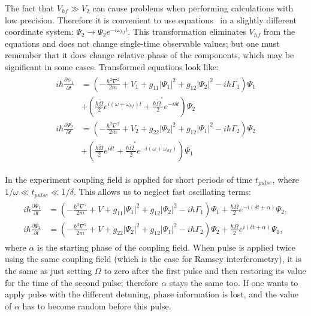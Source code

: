 The fact that $V_{hf} \gg V_2$ can cause problems when performing calculations with low precision.
Therefore it is convenient to use equations~
in a slightly different coordinate system:
$\Psi_2 \rightarrow \Psi_2 e^{-i \omega_{hf} t}$.
This transformation eliminates $V_{hf}$ from the equations and does not change single-time observable values;
but one must remember that it does change relative phase of the components,
which may be significant in some cases.
Transformed equations look like:
\begin{align*}
\begin{split}
	i \hbar \frac{\partial \psi_1}{\partial t} & = \left(
		-\frac{\hbar^2 \nabla^2}{2 m} + V_1
		+ g_{11} \lvert \Psi_1 \rvert^2
		+ g_{12} \lvert \Psi_2 \rvert^2
		- i \hbar \Gamma_1
	\right) \Psi_1 \\
	& + \left(
		\frac{\hbar \tilde{\Omega}}{2} e^{i (\omega + \omega_{hf}) t}
		+ \frac{\hbar \tilde{\Omega}^*}{2} e^{-i \delta t}
	\right) \Psi_2 \\
	i \hbar \frac{\partial \Psi_2}{\partial t} & = \left(
		-\frac{\hbar^2 \nabla^2}{2 m} + V_2
		+ g_{22} \lvert \Psi_2 \rvert^2
		+ g_{12} \lvert \Psi_1 \rvert^2
		- i \hbar \Gamma_2
	\right) \Psi_2 \\
	& + \left(
		\frac{\hbar \tilde{\Omega}}{2} e^{i \delta t}
		+ \frac{\hbar \tilde{\Omega}^*}{2} e^{-i (\omega + \omega_{hf})}
	\right) \Psi_1
\end{split}
\end{align*}

In the experiment coupling field is applied for short periods of time $t_{pulse}$,
where $1 / \omega \ll t_{pulse} \ll 1 / \delta$.
This allows us to neglect fast oscillating terms:
\begin{align}
\label{eqn:mean-field:cgpes_simplified}
\begin{split}
	i \hbar \frac{\partial \Psi_1}{\partial t} & = \left(
		-\frac{\hbar^2 \nabla^2}{2 m} + V
		+ g_{11} \lvert \Psi_1 \rvert^2
		+ g_{12} \lvert \Psi_2 \rvert^2
		- i \hbar \Gamma_1
	\right) \Psi_1
	+ \frac{\hbar \Omega}{2} e^{-i (\delta t + \alpha)} \Psi_2, \\
	i \hbar \frac{\partial \Psi_2}{\partial t} & = \left(
		-\frac{\hbar^2 \nabla^2}{2 m} + V
		+ g_{22} \lvert \Psi_2 \rvert^2
		+ g_{12} \lvert \Psi_1 \rvert^2
		- i \hbar \Gamma_2
	\right) \Psi_2 +
	\frac{\hbar \Omega}{2} e^{i (\delta t + \alpha)} \Psi_1,
\end{split}
\end{align}
where $\alpha$ is the starting phase of the coupling field.
When pulse is applied twice using the same coupling field (which is the case for Ramsey interferometry),
it is the same as just setting $\Omega$ to zero after the first pulse and then restoring its value for the time of the second pulse;
therefore $\alpha$ stays the same too.
If one wants to apply pulse with the different detuning, phase information is lost,
and the value of $\alpha$ has to become random before this pulse.

